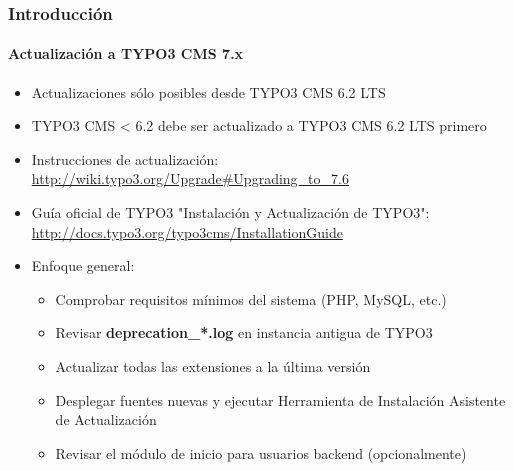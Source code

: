 \begin{frame}[fragile]
	\frametitle{Introducción}
	\framesubtitle{Actualización a TYPO3 CMS 7.x}

	\begin{itemize}
		\item Actualizaciones sólo posibles desde TYPO3 CMS 6.2 LTS
		\item TYPO3 CMS < 6.2 debe ser actualizado a TYPO3 CMS 6.2 LTS primero
	\end{itemize}

	\begin{itemize}

		\item Instrucciones de actualización:\newline
			\smaller\url{http://wiki.typo3.org/Upgrade#Upgrading_to_7.6}\normalsize
		\item Guía oficial de TYPO3 "Instalación y Actualización de TYPO3":
			\smaller\url{http://docs.typo3.org/typo3cms/InstallationGuide}\normalsize
		\item Enfoque general:
			\begin{itemize}
				\item Comprobar requisitos mínimos del sistema \small(PHP, MySQL, etc.)
				\item Revisar \textbf{deprecation\_*.log} en instancia antigua de TYPO3
				\item Actualizar todas las extensiones a la última versión
				\item Desplegar fuentes nuevas y ejecutar Herramienta de Instalación \textrightarrow Asistente de Actualización
				\item Revisar el módulo de inicio para usuarios backend (opcionalmente)
			\end{itemize}
	\end{itemize}

\end{frame}

